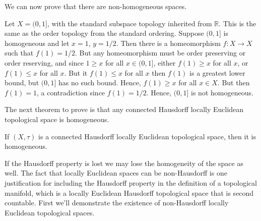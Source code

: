 \documentclass{article}                                                        %
\begin{document}
        We can now prove that there are non-homogeneous spaces.
        \begin{example}
                Let $X=(0,1]$, with the standard subspace topology inherited
                from $\mathbb{R}$. This is the same as the order topology from
                the standard ordering. Suppose $(0,1]$ is homogeneous and let
                $x=1$, $y=1/2$. Then there is a homeomorphism
                $f:X\rightarrow{X}$ such that $f(1)=1/2$. But any homeomorphism
                must be order preserving or order reserving, and since
                $1\geq{x}$ for all $x\in(0,1]$, either $f(1)\geq{x}$ for all
                $x$, or $f(1)\leq{x}$ for all $x$. But it $f(1)\leq{x}$ for all
                $x$ then $f(1)$ is a greatest lower bound, but $(0,1]$ has no
                such bound. Hence, $f(1)\geq{x}$ for all $x\in{X}$. But then
                $f(1)=1$, a contradiction since $f(1)=1/2$. Hence, $(0,1]$ is
                not homogeneous.
        \end{example}
        The next theorem to prove is that any connected Hausdorff locally
        Euclidean topological space is homogeneous.
        \begin{theorem}
                If $(X,\tau)$ is a connected Hausdorff locally Euclidean
                topological space, then it is homogeneous.
        \end{theorem}
        If the Hausdorff property is lost we may lose the homogeneity of the
        space as well. The fact that locally Euclidean spaces can be
        non-Hausdorff is one justification for including the Hausdorff
        property in the definition of a topological manifold, which is a
        locally Euclidean Hausdorff topological space that is second
        countable. First we'll demonstrate the existence of non-Hausdorff
        locally Euclidean topological spaces.
\end{document}
